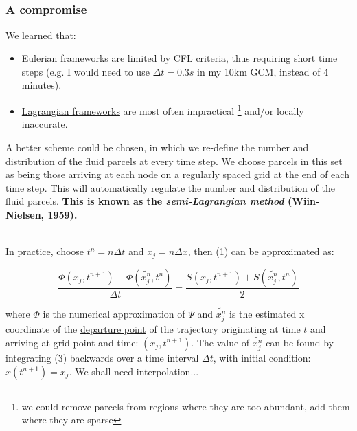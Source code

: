 \documentclass[xcolor=dvipsnames]{beamer} %
\newcommand{\BSS}{ \begin{scriptsize}}
\newcommand{\ESS}{ \end{scriptsize}}
\begin{document}
\subsection{}
\frame
{
	\frametitle{A compromise}
\BSS
We learned that:
\begin{itemize}
	\item \underline{Eulerian frameworks} are limited by CFL criteria, thus requiring short time steps (e.g. I would need to use $\Delta t = 0.3s$ in my 10km GCM, instead of 4 minutes).
	\item \underline{Lagrangian frameworks} are most often impractical \footnote{\tiny we could remove parcels from regions where they are too abundant, add them where they are sparse} and/or locally inaccurate.
\end{itemize}
A better scheme could be chosen, in which we re-define the number and distribution of the fluid parcels at every time step. We choose parcels in this set as being those arriving at each node on a regularly spaced grid at the end of each time step. This will automatically regulate the number and distribution of the fluid parcels. \textbf{This is known as the \emph{semi-Lagrangian method} (Wiin-Nielsen, 1959).}\\

~

In practice, choose $t^n=n\Delta t$ and $x_j=n\Delta x$, then (1) can be approximated as:
 
 \begin{equation}
 \frac {\Phi(x_j,t^{n+1}) - \Phi (\tilde{x_j^n},t^{n})}{\Delta t}=\frac{S(x_j,t^{n+1}) + S (\tilde{x_j^n},t^{n})}{2}
 \label{SL}	
 \end{equation}

where $\Phi$ is the numerical approximation of $\Psi$ and $\tilde{x_j^n}$ is the estimated x coordinate of the \underline{departure point} of the trajectory originating at time $t$ and arriving at grid point and time: $(x_j,t^{n+1})$. The value of $\tilde{x_j^n}$ can be found by integrating (3) backwards over a time interval $\Delta t$, with initial condition: $x(t^{n+1})= x_j$. We shall need interpolation...

\ESS
}
\end{document}
